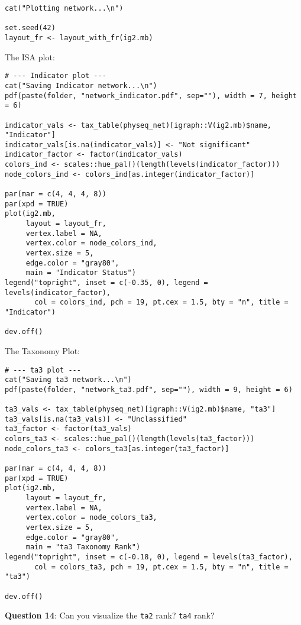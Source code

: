 \documentclass[
]{book}
\begin{document}
\begin{verbatim}
cat("Plotting network...\n")

set.seed(42)
layout_fr <- layout_with_fr(ig2.mb)
\end{verbatim}

The ISA plot:

\begin{verbatim}
# --- Indicator plot ---
cat("Saving Indicator network...\n")
pdf(paste(folder, "network_indicator.pdf", sep=""), width = 7, height = 6)

indicator_vals <- tax_table(physeq_net)[igraph::V(ig2.mb)$name, "Indicator"]
indicator_vals[is.na(indicator_vals)] <- "Not significant"
indicator_factor <- factor(indicator_vals)
colors_ind <- scales::hue_pal()(length(levels(indicator_factor)))
node_colors_ind <- colors_ind[as.integer(indicator_factor)]

par(mar = c(4, 4, 4, 8))
par(xpd = TRUE)
plot(ig2.mb,
     layout = layout_fr,
     vertex.label = NA,
     vertex.color = node_colors_ind,
     vertex.size = 5,
     edge.color = "gray80",
     main = "Indicator Status")
legend("topright", inset = c(-0.35, 0), legend = levels(indicator_factor),
       col = colors_ind, pch = 19, pt.cex = 1.5, bty = "n", title = "Indicator")

dev.off()
\end{verbatim}

The Taxonomy Plot:

\begin{verbatim}
# --- ta3 plot ---
cat("Saving ta3 network...\n")
pdf(paste(folder, "network_ta3.pdf", sep=""), width = 9, height = 6)

ta3_vals <- tax_table(physeq_net)[igraph::V(ig2.mb)$name, "ta3"]
ta3_vals[is.na(ta3_vals)] <- "Unclassified"
ta3_factor <- factor(ta3_vals)
colors_ta3 <- scales::hue_pal()(length(levels(ta3_factor)))
node_colors_ta3 <- colors_ta3[as.integer(ta3_factor)]

par(mar = c(4, 4, 4, 8))
par(xpd = TRUE)
plot(ig2.mb,
     layout = layout_fr,
     vertex.label = NA,
     vertex.color = node_colors_ta3,
     vertex.size = 5,
     edge.color = "gray80",
     main = "ta3 Taxonomy Rank")
legend("topright", inset = c(-0.18, 0), legend = levels(ta3_factor),
       col = colors_ta3, pch = 19, pt.cex = 1.5, bty = "n", title = "ta3")

dev.off()
\end{verbatim}

\textbf{Question 14}: Can you visualize the \texttt{ta2} rank? \texttt{ta4} rank?
\end{document}
